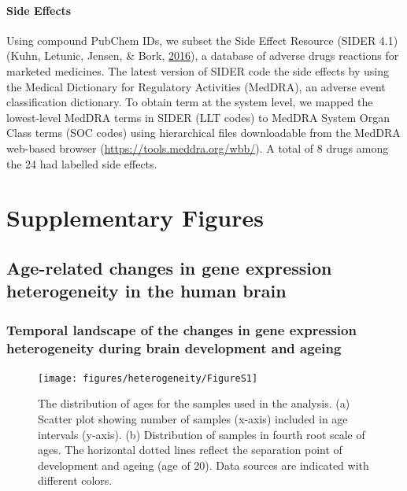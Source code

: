 \documentclass[12pt,twoside]{unicam}
\begin{document}
\hypertarget{side-effects}{%
\subsubsection{Side Effects}\label{side-effects}}

Using compound PubChem IDs, we subset the Side Effect Resource (SIDER 4.1) (Kuhn, Letunic, Jensen, \& Bork, \protect\hyperlink{ref-Kuhn2016}{2016}), a database of adverse drugs reactions for marketed medicines. The latest version of SIDER code the side effects by using the Medical Dictionary for Regulatory Activities (MedDRA), an adverse event classification dictionary. To obtain term at the system level, we mapped the lowest-level MedDRA terms in SIDER (LLT codes) to MedDRA System Organ Class terms (SOC codes) using hierarchical files downloadable from the MedDRA web-based browser (\url{https://tools.meddra.org/wbb/}). A total of 8 drugs among the 24 had labelled side effects.

\hypertarget{supplementary-figures}{%
\chapter{Supplementary Figures}\label{supplementary-figures}}

\hypertarget{age-related-changes-in-gene-expression-heterogeneity-in-the-human-brain-1}{%
\section{Age-related changes in gene expression heterogeneity in the human brain}\label{age-related-changes-in-gene-expression-heterogeneity-in-the-human-brain-1}}

\hypertarget{temporal-landscape-of-the-changes-in-gene-expression-heterogeneity-during-brain-development-and-ageing}{%
\subsection{Temporal landscape of the changes in gene expression heterogeneity during brain development and ageing}\label{temporal-landscape-of-the-changes-in-gene-expression-heterogeneity-during-brain-development-and-ageing}}

\begin{figure}

{\centering \texttt{[image: figures/heterogeneity/FigureS1]} 

}

\caption[Age distribution of individual datasets]{The distribution of ages for the samples used in the analysis. (a) Scatter plot showing number of samples (x-axis) included in age intervals (y-axis). (b) Distribution of samples in fourth root scale of ages. The horizontal dotted lines reflect the separation point of development and ageing (age of 20). Data sources are indicated with different colors.}\label{fig:hetFigS1}
\end{figure}
\end{document}
